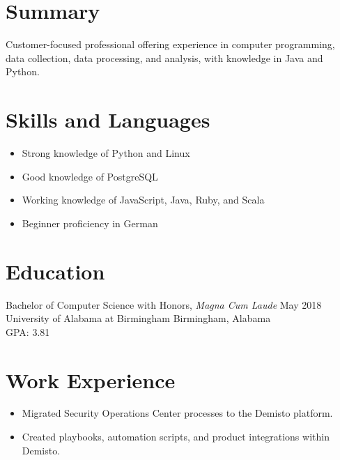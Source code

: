\documentclass[10pt]{setzerresume}
\begin{document}


  \section{Summary}
  Customer-focused professional offering experience in computer programming, data collection, data processing, and analysis, with knowledge in Java and Python.

  \section{Skills and Languages}

  \begin{itemize}[nosep]
    \item Strong knowledge of Python and Linux
    \item Good knowledge of PostgreSQL
    \item Working knowledge of JavaScript, Java, Ruby, and Scala
    \item Beginner proficiency in German
  \end{itemize}

  \section{Education}
  Bachelor of Computer Science with Honors, \textit{Magna Cum Laude} \hfill May 2018 \\
  University of Alabama at Birmingham \hfill Birmingham, Alabama \\
  GPA\@: 3.81


  \section{Work Experience}


  \begin{itemize}[nosep]
    \item Migrated Security Operations Center processes to the Demisto platform.
    \item Created playbooks, automation scripts, and product integrations within Demisto.
  \end{itemize}


\end{document}
